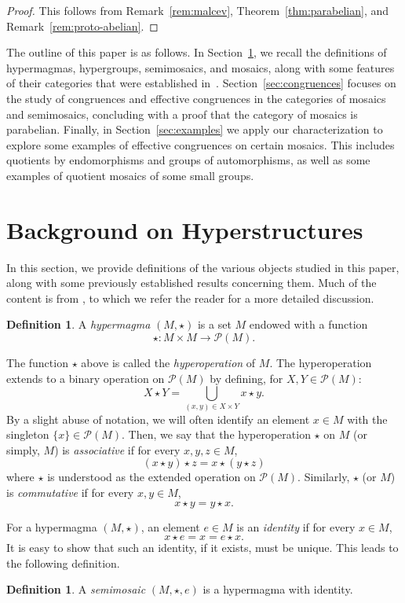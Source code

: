 \documentclass[reqno]{amsart}
\renewcommand{\P}{\mathcal{P}}
\newcommand{\separate}{\bigskip}
\numberwithin{equation}{section}
\theoremstyle{plain}
\theoremstyle{definition}
\newtheorem{definition}[equation]{Definition}
\begin{document}
\begin{proof}
This follows from Remark~\ref{rem:malcev}, Theorem~\ref{thm:parabelian}, and Remark~\ref{rem:proto-abelian}.
\end{proof}
\separate

The outline of this paper is as follows.
In Section~\ref{sec:hyperstructures}, we recall the definitions of hypermagmas, hypergroups, semimosaics, and mosaics, along with some features of their categories that were established in~\cite{NakamuraReyes}. 
Section~\ref{sec:congruences} focuses on the study of congruences and effective congruences in the categories of mosaics and semimosaics, concluding with a proof that the category of mosaics is parabelian. 
Finally, in Section~\ref{sec:examples} we apply our characterization to explore some examples of effective congruences on certain mosaics. This includes quotients by endomorphisms and groups of automorphisms, as well as some examples of quotient mosaics of some small groups.

\section{Background on Hyperstructures}
\label{sec:hyperstructures}

In this section, we provide definitions of the various objects studied in this paper, along with some previously established results concerning them. Much of the content is from \cite{NakamuraReyes}, to which we refer the reader for a more detailed discussion.

\begin{definition}
    A \textit{hypermagma} $(M, \star)$ is a set $M$ endowed with a function $$\star:M\times M\to \P(M).$$
\end{definition}

The function $\star$ above is called the \textit{hyperoperation} of $M$. The hyperoperation extends to a binary operation on $\P(M)$ by defining, for $X, Y\in \P(M)$:
$$
X\star Y = \bigcup_{(x, y) \in X\times Y} x\star y.
$$
By a slight abuse of notation, we will often identify an element $x\in M$ with the singleton $\{x\}\in \P(M)$. Then, we say that the hyperoperation $\star$ on $M$ (or simply, $M$) is \textit{associative} if for every $x, y, z\in M$,
$$
(x\star y)\star z = x\star(y \star z)
$$
where $\star$ is understood as the extended operation on $\P(M)$. Similarly, $\star$ (or $M$) is \textit{commutative} if for every $x, y\in M$,
$$
x\star y = y\star x.
$$

For a hypermagma $(M, \star)$, an element $e\in M$ is an \textit{identity} if for every $x\in M$, 
$$
x\star e = x = e\star x.
$$
It is easy to show that such an identity, if it exists, must be unique. This leads to the following definition.
\begin{definition}
    A \textit{semimosaic} $(M, \star, e)$ is a hypermagma with identity.
\end{definition} 
\end{document}
